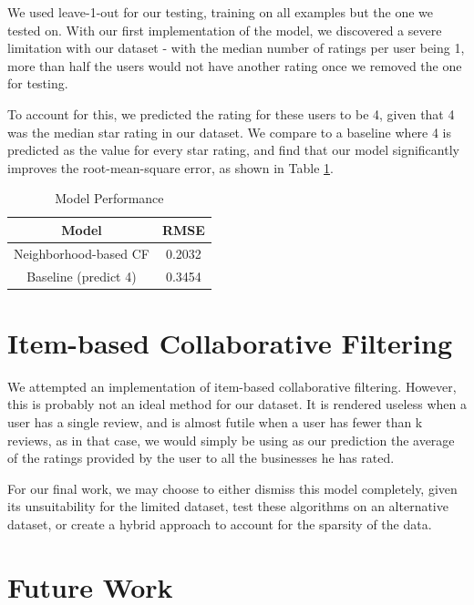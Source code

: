 \documentclass[10pt, letterpaper]{article}
\begin{document}
We used leave-1-out for our testing, training on all examples but the one
we tested on. With our first implementation of the model, we discovered a severe
limitation with our dataset - with the median number of ratings per user
being 1, more than half the users would not have another rating once we
removed the one for testing. 

To account for this, we predicted the rating for these users to be 4,
given that 4 was the median star rating in our dataset. We compare to a
baseline where 4 is predicted as the value for every star rating, and find
that our model significantly improves the root-mean-square error, as shown
in Table \ref{ncf}.

\begin{table}[htb]
\centering
\begin{tabular}{|c|c|}
\hline
{\bf Model} &{\bf RMSE} \tabularnewline \hline
Neighborhood-based CF &0.2032 \tabularnewline
Baseline (predict 4) &0.3454
\tabularnewline \hline

\end{tabular}
\caption{ Model Performance }
\label{ncf}
\end{table}

\section{Item-based Collaborative Filtering}
We attempted an implementation of item-based collaborative
filtering. However, this is probably not an ideal method for our
dataset. It is rendered useless when a user has a single review, and is
almost futile when a user has fewer than k reviews, as in that case, we
would simply be using as our prediction the average of the ratings
provided by the user to all the businesses he has rated.

For our final work, we may choose to either dismiss this model completely,
given its unsuitability for the limited dataset, test these algorithms on
an alternative dataset, or create a hybrid approach to account for the
sparsity of the data.

\section{Future Work}
\end{document}
